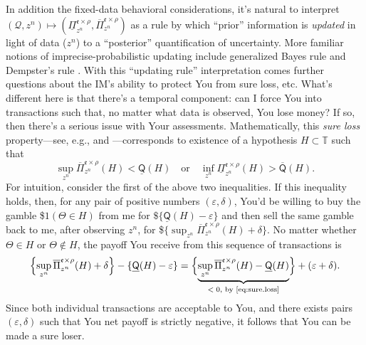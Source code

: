 \documentclass[a4paper, 12pt]{article}
\theoremstyle{plain}
\theoremstyle{definition}
\theoremstyle{remark}
\newcommand{\TT}{\mathbb{T}}
\newcommand{\eps}{\varepsilon}
\newcommand{\credal}{\mathscr{Q}}
\newcommand{\lPi}{\underline{\Pi}}
\newcommand{\uPi}{\overline{\Pi}}
\newcommand{\lprior}{\underline{\mathsf{Q}}}
\newcommand{\uprior}{\overline{\mathsf{Q}}}
\newcommand{\eval}{\mathfrak{e}}
\begin{document}
In addition the fixed-data behavioral considerations, it's natural to interpret $(\credal, z^n) \mapsto (\lPi_{z^n}^{\eval \times \rho}, \uPi_{z^n}^{\eval \times \rho})$ as a rule by which ``prior'' information is {\em updated} in light of data ($z^n$) to a ``posterior'' quantification of uncertainty.  More familiar notions of imprecise-probabilistic updating include generalized Bayes rule \citep{walley1991, miranda.cooman.chapter} and Dempster's rule \citep[e.g.,][]{shafer1976, cuzzolin.book}.
With this ``updating rule'' interpretation comes further questions about the IM's ability to protect You from sure loss, etc.  What's different here is that there's a temporal component: can I force You into transactions such that, no matter what data is observed, You lose money?  If so, then there's a serious issue with Your assessments. Mathematically, this {\em sure loss} property---see, e.g., \citet[][Sec.~2.4.1]{walley1991} and \citet[][Def.~3.3]{gong.meng.update}---corresponds to existence of a hypothesis $H \subset \TT$ such that 
\begin{equation}
\label{eq:sure.loss}
\sup_{z^n} \uPi_{z^n}^{\eval \times \rho}(H) < \lprior(H) \quad \text{or} \quad  \inf_{z^n} \lPi_{z^n}^{\eval \times \rho}(H) > \uprior(H). 
\end{equation}
For intuition, consider the first of the above two inequalities.  If this inequality holds, then, for any pair of positive numbers $(\eps, \delta)$, You'd be willing to buy the gamble \$$1(\Theta \in H)$ from me for $\$\{\lprior(H) - \eps\}$ and then sell the same gamble back to me, after observing $z^n$, for \$$\{\sup_{z^n} \uPi_{z^n}^{\eval \times \rho}(H) + \delta\}$.  No matter whether $\Theta \in H$ or $\Theta \not\in H$, the payoff You receive from this sequence of transactions is 
\[ \Bigl\{ \sup_{z^n} \uPi_{z^n}^{\eval \times \rho}(H) + \delta \Bigr\} - \{\lprior(H) - \eps\} = \Bigl\{ \underbrace{\sup_{z^n} \uPi_{z^n}^{\eval \times \rho}(H) - \lprior(H)}_{\text{$<0$, by \eqref{eq:sure.loss}}} \Bigr\} + (\eps + \delta). \]
Since both individual transactions are acceptable to You, and there exists pairs $(\eps, \delta)$ such that You net payoff is strictly negative, it follows that You can be made a sure loser.  
\end{document}
